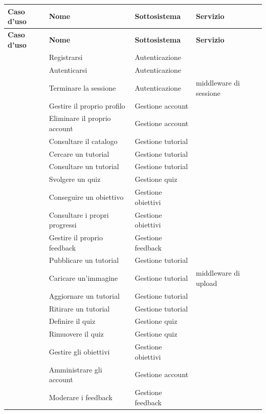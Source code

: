 \begin{longtable}{@{}l L{4.6cm} L{3.4cm} L{4.0cm}@{}}
\toprule
\textbf{Caso d'uso} & \textbf{Nome} & \textbf{Sottosistema} & \textbf{Servizio} \\
\midrule
\endfirsthead
\toprule
\textbf{Caso d'uso} & \textbf{Nome} & \textbf{Sottosistema} & \textbf{Servizio} \\
\midrule
\endhead
\bottomrule
\endlastfoot

 & Registrarsi                   & Autenticazione     &  \\
 & Autenticarsi                  & Autenticazione     &  \\
 & Terminare la sessione         & Autenticazione     & middleware di sessione \\
 & Gestire il proprio profilo    & Gestione account   &  \\
 & Eliminare il proprio account  & Gestione account   &  \\
 & Consultare il catalogo        & Gestione tutorial  &  \\
 & Cercare un tutorial           & Gestione tutorial  &  \\
 & Consultare un tutorial        & Gestione tutorial  &  \\
 & Svolgere un quiz              & Gestione quiz      &  \\
 & Conseguire un obiettivo       & Gestione obiettivi &  \\
 & Consultare i propri progressi & Gestione obiettivi &  \\
 & Gestire il proprio feedback   & Gestione feedback  &  \\
 & Pubblicare un tutorial        & Gestione tutorial  &  \\
 & Caricare un'immagine          & Gestione tutorial  & middleware di upload \\
 & Aggiornare un tutorial        & Gestione tutorial  &  \\
 & Ritirare un tutorial          & Gestione tutorial  &  \\
 & Definire il quiz              & Gestione quiz      &  \\
 & Rimuovere il quiz             & Gestione quiz      &  \\
 & Gestire gli obiettivi         & Gestione obiettivi &  \\
 & Amministrare gli account      & Gestione account   &  \\
 & Moderare i feedback           & Gestione feedback  &  \\

\end{longtable}

